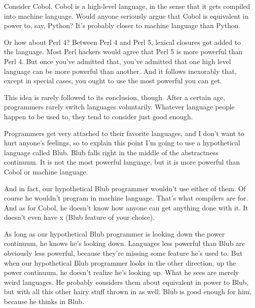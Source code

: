 Consider Cobol. Cobol is a high-level
                  language, in the sense that it gets compiled into machine
                  language. Would anyone seriously argue that Cobol is
                  equivalent in power to, say, Python? It's probably closer to
                  machine language than Python.

Or how about Perl 4?
                  Between Perl 4 and Perl 5, lexical closures got added to the
                  language. Most Perl hackers would agree that Perl 5 is more
                  powerful than Perl 4. But once you've admitted that, you've
                  admitted that one high level language can be more powerful
                  than another. And it follows inexorably that, except in
                  special cases, you ought to use the most powerful you can
                  get.

This idea is rarely followed to its
                  conclusion, though. After a certain age, programmers rarely
                  switch languages voluntarily. Whatever language people happen
                  to be used to, they tend to consider just good enough.

Programmers
                  get very attached to their favorite languages, and I don't
                  want to hurt anyone's feelings, so to explain this point I'm
                  going to use a hypothetical language called Blub. Blub falls
                  right in the middle of the abstractness continuum. It is not
                  the most powerful language, but it is more powerful than Cobol
                  or machine language.

And in fact, our hypothetical
                  Blub programmer wouldn't use either of them. Of course he
                  wouldn't program in machine language. That's what compilers
                  are for. And as for Cobol, he doesn't know how anyone can get
                  anything done with it. It doesn't even have x (Blub feature of
                  your choice).

As long as our hypothetical Blub
                  programmer is looking down the power continuum, he knows he's
                  looking down. Languages less powerful than Blub are obviously
                  less powerful, because they're missing some feature he's used
                  to. But when our hypothetical Blub programmer looks in the
                  other direction, up the power continuum, he doesn't realize
                  he's looking up. What he sees are merely weird languages. He
                  probably considers them about equivalent in power to Blub, but
                  with all this other hairy stuff thrown in as well. Blub is
                  good enough for him, because he thinks in Blub.

